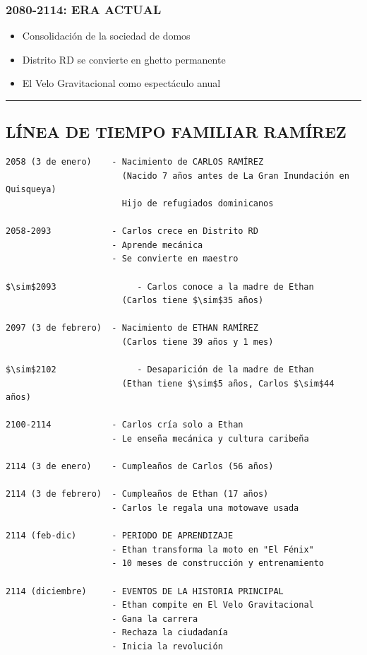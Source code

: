 \documentclass[11pt,a4paper]{report}
\begin{document}
\subsubsection{2080-2114: ERA ACTUAL}
\begin{itemize}
  \item Consolidación de la sociedad de domos
  \item Distrito RD se convierte en ghetto permanente
  \item El Velo Gravitacional como espectáculo anual

\end{itemize}
\bigskip\hrule\bigskip

\subsection{LÍNEA DE TIEMPO FAMILIAR RAMÍREZ}

\begin{verbatim}
2058 (3 de enero)    - Nacimiento de CARLOS RAMÍREZ
                       (Nacido 7 años antes de La Gran Inundación en Quisqueya)
                       Hijo de refugiados dominicanos

2058-2093            - Carlos crece en Distrito RD
                     - Aprende mecánica
                     - Se convierte en maestro

$\sim$2093                - Carlos conoce a la madre de Ethan
                       (Carlos tiene $\sim$35 años)

2097 (3 de febrero)  - Nacimiento de ETHAN RAMÍREZ
                       (Carlos tiene 39 años y 1 mes)

$\sim$2102                - Desaparición de la madre de Ethan
                       (Ethan tiene $\sim$5 años, Carlos $\sim$44 años)

2100-2114            - Carlos cría solo a Ethan
                     - Le enseña mecánica y cultura caribeña

2114 (3 de enero)    - Cumpleaños de Carlos (56 años)

2114 (3 de febrero)  - Cumpleaños de Ethan (17 años)
                     - Carlos le regala una motowave usada

2114 (feb-dic)       - PERIODO DE APRENDIZAJE
                     - Ethan transforma la moto en "El Fénix"
                     - 10 meses de construcción y entrenamiento

2114 (diciembre)     - EVENTOS DE LA HISTORIA PRINCIPAL
                     - Ethan compite en El Velo Gravitacional
                     - Gana la carrera
                     - Rechaza la ciudadanía
                     - Inicia la revolución
\end{verbatim}
\end{document}
